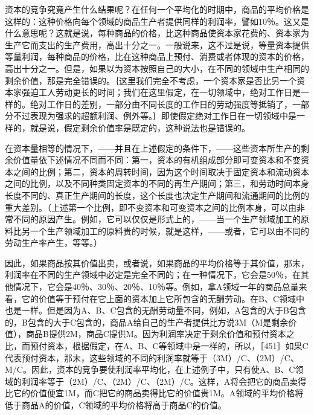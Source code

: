 资本的竞争究竟产生什么结果呢？在任何一个平均化的时期中，商品的平均价格是这样的：这种价格向每个领域的商品生产者提供同样的利润率，譬如10％。这又是什么意思呢？这就是说，每种商品的价格，比这种商品使资本家花费的、资本家为生产它而支出的生产费用，高出十分之一。一般说来，这不过是说，等量资本提供等量利润，每种商品的价格，比在这种商品上预付、消费或者体现的资本的价格，高出十分之一。但是，如果以为资本按照自己的大小，在不同的领域中生产相同的剩余价值，那是完全错误的。｛这里我们完全不考虑，一个资本家是否比另一个资本家强迫工人劳动更长的时间；我们在这里假定，在一切领域中，绝对工作日是一样的。绝对工作日的差别，一部分由不同长度的工作日的劳动强度等抵销了，一部分不过表现为强求的超额利润、例外等。｝即使假定绝对工作日在一切领域中是一样的，就是说，假定剩余价值率是既定的，这种说法也是错误的。

在资本量相等的情况下，——并且在上述假定的条件下，——这些资本所生产的剩余价值量依下述情况不同而不同：第一，资本的有机组成部分即可变资本和不变资本之间的比例；第二，资本的周转时间，因为这个时间取决于固定资本和流动资本之间的比例，以及不同种类固定资本的不同的再生产期间；第三，和劳动时间本身长度不同的、真正生产期间的长度，这个长度也决定生产期间和流通期间的比例的重大差别。（上述第一个比例，即不变资本和可变资本之间的比例本身，可以由非常不同的原因产生。例如，它可以仅仅是形式上的，——当一个生产领域加工的原料比另一个生产领域加工的原料贵的时候，就是这样，——或者，它可以由不同的劳动生产率产生，等等。）

因此，如果商品按其价值出卖，或者说，如果商品的平均价格等于其价值，那末，利润率在不同的生产领域中必定是完全不同的；在一种情况下，它会是50％，在其他情况下，它会是40％、30％、20％、10％等。例如，拿A领域一年的商品总量来看，它的价值等于预付在它上面的资本加上它所包含的无酬劳动。在B、C领域中也是一样。但是因为A、B、C包含的无酬劳动量不同，例如，A包含的大于B包含的，B包含的大于C包含的，商品A给自己的生产者提供比方说3M（M是剩余价值），商品B提供2M，商品C提供M。因为利润率决定于剩余价值和预付资本之比，而预付资本，根据假定，在A、B、C等领域中是一样的，所以，［451］如果C代表预付资本，那末，这些领域的不同的利润率就等于（3M）/C、（2M）/C、M/C。因此，资本的竞争要使利润率平均化，在上述例子中，只有使A、B、C领域的利润率等于（2M）/C、（2M）/C、（2M）/C。这样，A将会把它的商品卖得比它的价值便宜1M，而C把它的商品卖得比它的价值贵1M。A领域的平均价格将低于商品A的价值，C领域的平均价格将高于商品C的价值。

